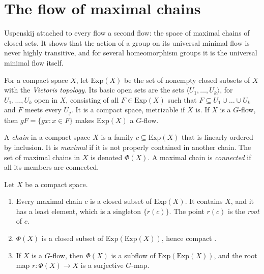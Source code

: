 \section{The flow of maximal chains}\label{sec:maximal-chains}

Uspenskij attached to every flow a second flow: the space of maximal chains of
closed sets. It shows that the action of a group on its universal minimal flow
is never highly transitive, and for several homeomorphism groups it is the
universal minimal flow itself.

\begin{definition}[Hyperspace]\label{def:hyperspace}
For a compact space $X$, let $\mathrm{Exp}(X)$ be the set of nonempty closed
subsets of $X$ with the \emph{Vietoris topology}. Its basic open sets are
the sets $\langle U_1,\dots,U_k\rangle$, for $U_1,\dots,U_k$ open in $X$,
consisting of all $F\in\mathrm{Exp}(X)$ such that
$F\subseteq U_1\cup\dots\cup U_k$ and $F$ meets every $U_j$. It is a compact
space, metrizable if $X$ is.
If $X$ is a $G$-flow, then $gF=\{gx : x\in F\}$ makes $\mathrm{Exp}(X)$ a
$G$-flow.
\end{definition}

\begin{definition}\label{def:maximal-chain}
A \emph{chain} in a compact space $X$ is a family $c\subseteq\mathrm{Exp}(X)$
that is linearly ordered by inclusion. It is \emph{maximal} if it is not
properly contained in another chain. The set of maximal chains in $X$ is
denoted $\Phi(X)$. A maximal chain is \emph{connected} if all its members are
connected.
\end{definition}

\begin{proposition}\label{prop:maximal-chains}
Let $X$ be a compact space.
\begin{enumerate}
\item Every maximal chain $c$ is a closed subset of $\mathrm{Exp}(X)$. It
  contains $X$, and it has a least element, which is a singleton
  $\{r(c)\}$. The point $r(c)$ is the \emph{root} of $c$.
\item $\Phi(X)$ is a closed subset of $\mathrm{Exp}(\mathrm{Exp}(X))$, hence
  compact \cite[Proposition~2.1]{Uspenskij2000}.
\item If $X$ is a $G$-flow, then $\Phi(X)$ is a subflow of
  $\mathrm{Exp}(\mathrm{Exp}(X))$, and the root map $r\colon\Phi(X)\to X$ is a
  surjective $G$-map.
\end{enumerate}
\end{proposition}

